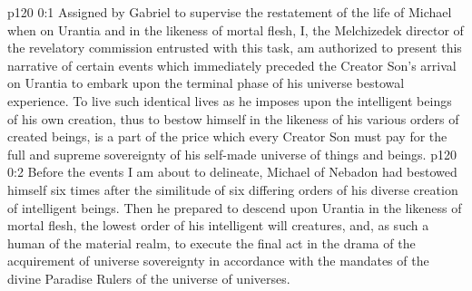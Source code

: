 \author{Mantutia Melchizedek}
\vs p120 0:1 Assigned by Gabriel to supervise the restatement of the life of Michael when on Urantia and in the likeness of mortal flesh, I, the Melchizedek director of the revelatory commission entrusted with this task, am authorized to present this narrative of certain events which immediately preceded the Creator Son’s arrival on Urantia to embark upon the terminal phase of his universe bestowal experience. To live such identical lives as he imposes upon the intelligent beings of his own creation, thus to bestow himself in the likeness of his various orders of created beings, is a part of the price which every Creator Son must pay for the full and supreme sovereignty of his self\hyp{}made universe of things and beings.
\vs p120 0:2 Before the events I am about to delineate, Michael of Nebadon had bestowed himself six times after the similitude of six differing orders of his diverse creation of intelligent beings. Then he prepared to descend upon Urantia in the likeness of mortal flesh, the lowest order of his intelligent will creatures, and, as such a human of the material realm, to execute the final act in the drama of the acquirement of universe sovereignty in accordance with the mandates of the divine Paradise Rulers of the universe of universes.
